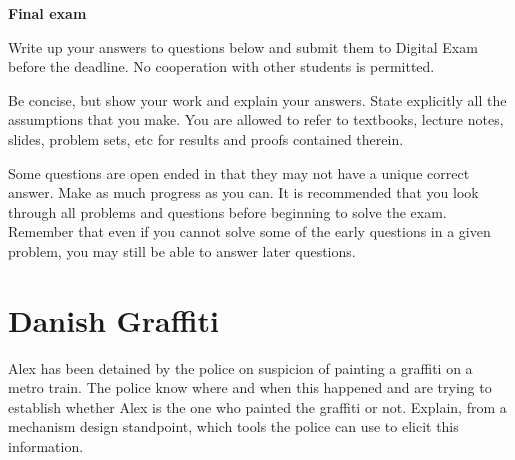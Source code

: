 \documentclass[a4paper]{article}
\newif\ifsolutions
\begin{document}
{\ifsolutions \else	
	
\fi}

\begin{center}
		\LARGE\textbf{Final exam {\ifsolutions solutions \fi}}
\end{center}

{\ifsolutions 
The solutions below are instructional, as opposed to ``perfect responses''. Their goal is to show the students the direction they were intended to take in their approach to the problems. The solutions may not provide exhaustive responses to all questions, and conversely, may include discussions that were not expected from the students.
	\else	
Write up your answers to questions below and submit them to Digital Exam before the deadline. No cooperation with other students is permitted.

Be concise, but show your work and explain your answers. State explicitly all the assumptions that you make. You are allowed to refer to textbooks, lecture notes, slides, problem sets, etc for results and proofs contained therein.

Some questions are open ended in that they may not have a unique correct answer. Make as much progress as you can. It is recommended that you look through all problems and questions before beginning to solve the exam. Remember that even if you cannot solve some of the early questions in a given problem, you may still be able to answer later questions. 
\fi}



\section{Danish Graffiti}
Alex has been detained by the police on suspicion of painting a graffiti on a metro train. The police know where and when this happened and are trying to establish whether Alex is the one who painted the graffiti or not. 
Explain, from a mechanism design standpoint, which tools the police can use to elicit this information.

\ifsolutions
\end{document}
